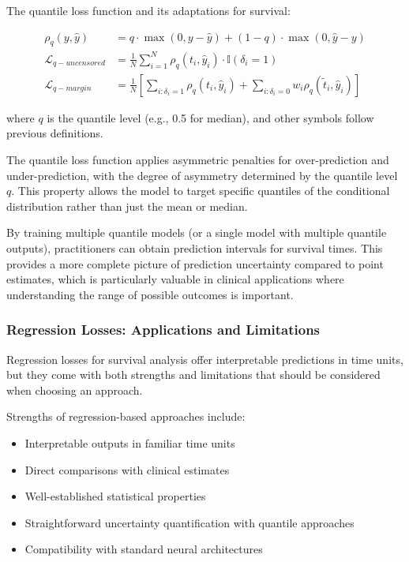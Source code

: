 \begin{definitionbox}[title=Quantile Loss for Survival]
  The quantile loss function and its adaptations for survival:

  \begin{align}
    \rho_q(y, \hat{y}) &= q \cdot \max(0, y - \hat{y}) + (1-q) \cdot \max(0, \hat{y} - y) \\
    \mathcal{L}_{q-uncensored} &= \frac{1}{N} \sum_{i=1}^N \rho_q(t_i, \hat{y}_i) \cdot \mathbb{I}(\delta_i = 1) \\
    \mathcal{L}_{q-margin} &= \frac{1}{N} \left[ \sum_{i:\delta_i = 1} \rho_q(t_i, \hat{y}_i) + \sum_{i:\delta_i = 0} w_i \rho_q(\tilde{t}_i, \hat{y}_i) \right]
  \end{align}

  where $q$ is the quantile level (e.g., 0.5 for median), and other symbols follow previous definitions.
\end{definitionbox}

The quantile loss function applies asymmetric penalties for over-prediction and under-prediction, with the degree of asymmetry determined by the quantile level $q$. This property allows the model to target specific quantiles of the conditional distribution rather than just the mean or median.

By training multiple quantile models (or a single model with multiple quantile outputs), practitioners can obtain prediction intervals for survival times. This provides a more complete picture of prediction uncertainty compared to point estimates, which is particularly valuable in clinical applications where understanding the range of possible outcomes is important.

\subsubsection{Regression Losses: Applications and Limitations}

Regression losses for survival analysis offer interpretable predictions in time units, but they come with both strengths and limitations that should be considered when choosing an approach.

Strengths of regression-based approaches include:
\begin{itemize}
\item Interpretable outputs in familiar time units
\item Direct comparisons with clinical estimates
\item Well-established statistical properties
\item Straightforward uncertainty quantification with quantile approaches
\item Compatibility with standard neural architectures
\end{itemize}

